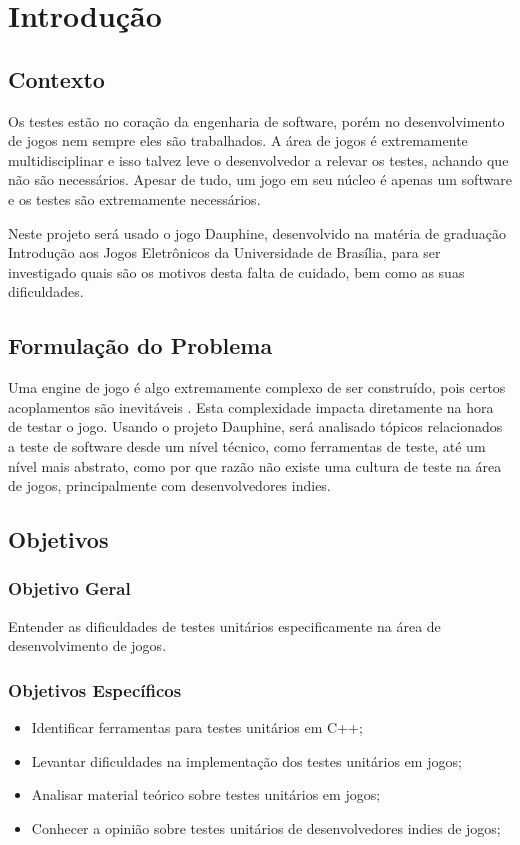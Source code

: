 \chapter[Introdução]{Introdução}

\section{Contexto}

Os testes estão no coração da engenharia de software, porém no desenvolvimento de jogos nem sempre eles são trabalhados. A área de jogos é extremamente multidisciplinar e isso talvez leve o desenvolvedor a relevar os testes, achando que não são necessários. Apesar de tudo, um jogo em seu núcleo é apenas um software e os testes são extremamente necessários.

Neste projeto será usado o jogo Dauphine, desenvolvido na matéria de graduação Introdução aos Jogos Eletrônicos da Universidade de Brasília, para ser investigado quais são os motivos desta falta de cuidado, bem como as suas dificuldades.

\section{Formulação do Problema}

Uma engine de jogo é algo extremamente complexo de ser construído, pois certos acoplamentos são inevitáveis \cite{gregory}. Esta complexidade impacta diretamente na hora de testar o jogo. Usando o projeto Dauphine, será analisado tópicos relacionados a teste de software desde um nível técnico, como ferramentas de teste, até um nível mais abstrato, como por que razão não existe uma cultura de teste na área de jogos, principalmente com desenvolvedores indies.

\section{Objetivos}

\subsection{Objetivo Geral}
Entender as dificuldades de testes unitários especificamente na área de desenvolvimento de jogos.

\subsection{Objetivos Específicos}
\begin{itemize}
\item Identificar ferramentas para testes unitários em C++;
\item Levantar dificuldades na implementação dos testes unitários em jogos;
\item Analisar material teórico sobre testes unitários em jogos;
\item Conhecer a opinião sobre testes unitários de desenvolvedores indies de jogos;
\end{itemize}

